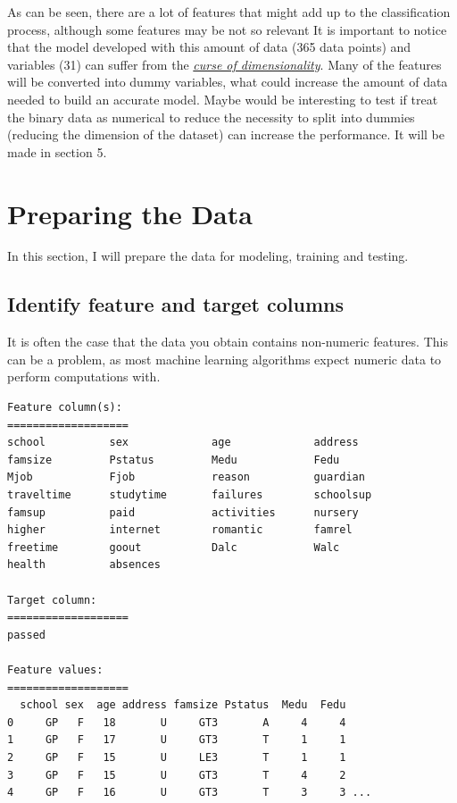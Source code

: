 \documentclass[a4paper]{article}
\begin{document}
As can be seen, there are a lot of features that might add up to the classification process, although some features may be not so relevant It is important to notice that the model developed with this amount of data (365 data points) and variables (31) can suffer from the  \href{https://en.wikipedia.org/wiki/Curse_of_dimensionality}{\textit{curse of dimensionality}}. Many of the features will be converted into dummy variables, what could increase the amount of data needed to build an accurate model. Maybe would be interesting to test if treat the binary data as numerical to reduce the necessity to split into dummies (reducing the dimension of the dataset) can increase the performance. It will be made in section 5.


\section{Preparing the Data}
In this section, I will prepare the data for modeling, training and testing.
\subsection{Identify feature and target columns}
It is often the case that the data you obtain contains non-numeric features. This can be a problem, as most machine learning algorithms expect numeric data to perform computations with.

\begin{lstlisting}
Feature column(s):
===================
school         	sex            	age            	address        
famsize        	Pstatus        	Medu           	Fedu           
Mjob           	Fjob           	reason         	guardian       
traveltime     	studytime      	failures       	schoolsup      
famsup         	paid           	activities     	nursery        
higher         	internet       	romantic       	famrel         
freetime       	goout          	Dalc           	Walc           
health         	absences       

Target column:
===================
passed

Feature values:
===================
  school sex  age address famsize Pstatus  Medu  Fedu
0     GP   F   18       U     GT3       A     4     4
1     GP   F   17       U     GT3       T     1     1
2     GP   F   15       U     LE3       T     1     1
3     GP   F   15       U     GT3       T     4     2
4     GP   F   16       U     GT3       T     3     3 ...
\end{lstlisting}
\end{document}
